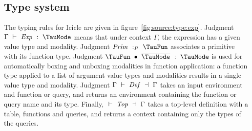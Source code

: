 





\subsection{Type system}
The typing rules for Icicle are given in figure~\ref{fig:source:type:exp}.
Judgment $\Typecheck{\Gamma}{\mi{Exp}}{\TauMode}$ means that under context $\Gamma$, the expression has a given value type and modality.
Judgment $\TypecheckP{\mi{Prim}}{\TauFun}$ associates a primitive with its function type.
Judgment $\TypecheckApp{\TauFun}{\ov{\TauMode}}{\TauMode}$ is used for automatically boxing and unboxing modalities in function application: a function type applied to a list of argument value types and modalities results in a single value type and modality.
Judgment $\TypecheckS{\Gamma}{\mi{Def}}{\Gamma}$ takes an input environment and function or query, and returns an environment containing the function or query name and its type.
Finally, $\TypecheckS{}{\mi{Top}}{\Gamma}$ takes a top-level definition with a table, functions and queries, and returns a context containing only the types of the queries.

